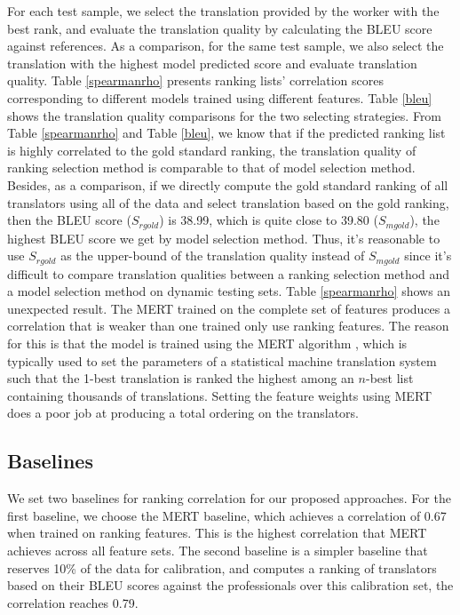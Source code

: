 \documentclass[11pt]{article}
\begin{document}
For each test sample, we select the translation  provided by the worker with the best rank, and evaluate the translation quality by calculating the BLEU score against references.  As a comparison, for the same test sample, we also select the translation with the highest  model predicted score and evaluate translation quality. Table \ref{spearmanrho} presents ranking lists' correlation scores corresponding to different models trained using different features.  Table \ref{bleu} shows the translation quality comparisons for the two selecting strategies. From Table \ref{spearmanrho} and  Table \ref{bleu}, we know that if the predicted ranking list is highly correlated to the gold standard ranking, the translation quality of ranking selection method is comparable to that of model selection method. Besides, as a comparison, if we directly compute the gold standard ranking of all translators using all of the data and select translation based on the gold ranking, then the BLEU score ($S_{rgold}$) is 38.99, which is quite close to 39.80 ($S_{mgold}$), the highest BLEU score we get by model selection method. Thus, it's reasonable to use  $S_{rgold}$ as the upper-bound of the translation quality instead of $S_{mgold}$ since it's difficult to compare translation qualities between a ranking selection method and a model selection method on dynamic testing sets. Table \ref{spearmanrho} shows an unexpected result. The MERT trained on the complete set of features produces a correlation that is weaker than one trained only use ranking features.  The reason for this is that the model is trained using the MERT algorithm \cite{och2003minimum}, which is typically used to set the parameters of a statistical machine translation system such that the 1-best translation is ranked the highest among an $n$-best list containing thousands of translations. Setting the feature weights using MERT does a poor job at producing a total ordering on the translators. 

\subsection{Baselines}
We set two baselines for ranking correlation for our proposed approaches. For the first baseline,  we choose the MERT baseline, which achieves a correlation of  0.67 when trained on ranking features. This is the highest correlation that  MERT achieves across all feature sets. The second baseline is a simpler baseline that reserves 10\% of the data for calibration, and computes a ranking of translators based on their BLEU scores against the professionals over this calibration set, the correlation reaches 0.79.  
 
\end{document}
